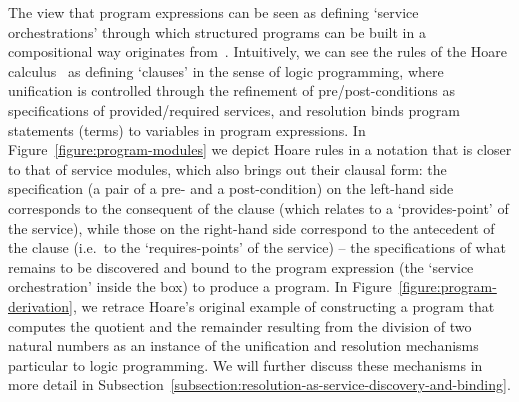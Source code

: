 \documentclass{LMCS}
\begin{document}
The view that program expressions can be seen as defining `service orchestrations' through which structured programs can be built in a compositional way originates from~\cite{Fiadeiro:The-many-faces-of-complexity-in-software-design-2012}.
Intuitively, we can see the rules of the Hoare calculus~\cite{Hoare:An-axiomatic-basis-for-computer-programming-1969} as defining `clauses' in the sense of logic programming, where unification is controlled through the refinement of pre/post-conditions as specifications of provided/required services, and resolution binds program statements (terms) to variables in program expressions.
In Figure~\ref{figure:program-modules} we depict Hoare rules in a notation that is closer to that of service modules, which also brings out their clausal form: the specification (a pair of a pre- and a post-condition) on the left-hand side corresponds to the consequent of the clause (which relates to a `provides-point' of the service), while those on the right-hand side correspond to the antecedent of the clause (i.e.\ to the `requires-points' of the service) -- the specifications of what remains to be discovered and bound to the program expression (the `service orchestration' inside the box) to produce a program.
In Figure~\ref{figure:program-derivation}, we retrace Hoare's original example of constructing a program that computes the quotient and the remainder resulting from the division of two natural numbers as an instance of the unification and resolution mechanisms particular to logic programming.
We will further discuss these mechanisms in more detail in Subsection~\ref{subsection:resolution-as-service-discovery-and-binding}.
\end{document}
